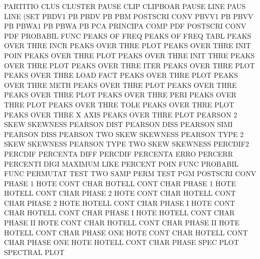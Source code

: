 PARTITIO CLUS                           CLUSTER
PAUSE    CLIP                           CLIPBOAR
PAUSE    LINE                           PAUS     LINE (SET
PBDV1                                   PB
PBDV                                    PB
PBM                                     POSTSCRI CONV
PBVV1                                   PB
PBVV                                    PB
PBWA1                                   PB
PBWA                                    PB
PCA                                     PRINCIPA COMP
PDF                                     POSTSCRI CONV
PDF                                     PROBABIL FUNC
PEAKS    OF   FREQ                      PEAKS    OF   FREQ TABL
PEAKS    OVER THRE INCR                 PEAKS    OVER THRE PLOT
PEAKS    OVER THRE INIT POIN            PEAKS    OVER THRE PLOT
PEAKS    OVER THRE INIT THRE            PEAKS    OVER THRE PLOT
PEAKS    OVER THRE ITER                 PEAKS    OVER THRE PLOT
PEAKS    OVER THRE LOAD FACT            PEAKS    OVER THRE PLOT
PEAKS    OVER THRE METH                 PEAKS    OVER THRE PLOT
PEAKS    OVER THRE                      PEAKS    OVER THRE PLOT
PEAKS    OVER THRE PERI                 PEAKS    OVER THRE PLOT
PEAKS    OVER THRE TOLE                 PEAKS    OVER THRE PLOT
PEAKS    OVER THRE X    AXIS            PEAKS    OVER THRE PLOT
PEARSON  2    SKEW                      SKEWNESS
PEARSON  DIST                           PEARSON  DISS
PEARSON  SIMI                           PEARSON  DISS
PEARSON  TWO  SKEW                      SKEWNESS
PEARSON  TYPE 2    SKEW                 SKEWNESS
PEARSON  TYPE TWO  SKEW                 SKEWNESS
PERCDIF2                                PERCDIF
PERCENTA DIFF                           PERCDIF
PERCENTA ERRO                           PERCERR
PERCENTI DIGI                           MAXIMUM  LIKE
PERCENT  POIN FUNC                      PROBABIL FUNC
PERMUTAT TEST                           TWO      SAMP PERM TEST
PGM                                     POSTSCRI CONV
PHASE    1    HOTE CONT CHAR            HOTELL   CONT CHAR
PHASE    1    HOTE                      HOTELL   CONT CHAR
PHASE    2    HOTE CONT CHAR            HOTELL   CONT CHAR
PHASE    2    HOTE                      HOTELL   CONT CHAR
PHASE    I    HOTE CONT CHAR            HOTELL   CONT CHAR
PHASE    I    HOTE                      HOTELL   CONT CHAR
PHASE    II   HOTE CONT CHAR            HOTELL   CONT CHAR
PHASE    II   HOTE                      HOTELL   CONT CHAR
PHASE    ONE  HOTE CONT CHAR            HOTELL   CONT CHAR
PHASE    ONE  HOTE                      HOTELL   CONT CHAR
PHASE    SPEC PLOT                      SPECTRAL PLOT
